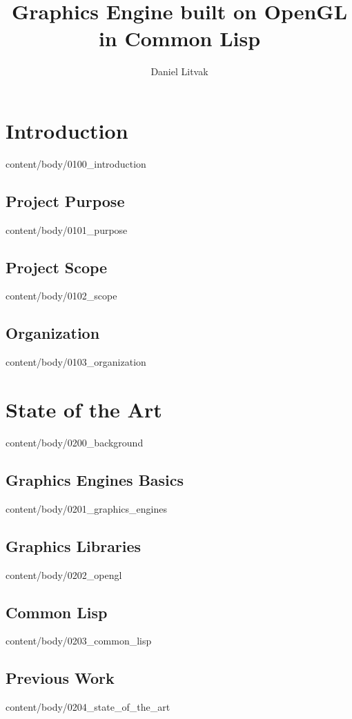 \documentclass[english, tfg, loc, lof, covers, printable, firstnumbered, epsbased]{tfgtfmthesisuam}
\title{Graphics Engine built on OpenGL in Common Lisp}
\author{Daniel Litvak}
\begin{document}



\chapter{Introduction}{content/body/0100_introduction}                              %
  \section{Project Purpose}{content/body/0101_purpose}                              %
  \section{Project Scope}{content/body/0102_scope}                                  %
  \section{Organization}{content/body/0103_organization}                            %

\chapter{State of the Art}{content/body/0200_background}                            %
  \section{Graphics Engines Basics}{content/body/0201_graphics_engines}             %
  \section{Graphics Libraries}{content/body/0202_opengl}                            %
  \section{Common Lisp}{content/body/0203_common_lisp}                              %
  \section{Previous Work}{content/body/0204_state_of_the_art}                       %
\end{document}
